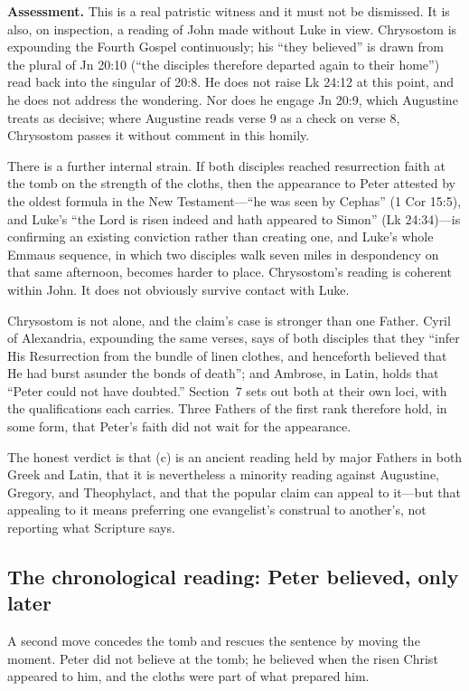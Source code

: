 \textbf{Assessment.} This is a real patristic witness and it must not be
dismissed. It is also, on inspection, a reading of John made without Luke in
view. Chrysostom is expounding the Fourth Gospel continuously; his ``they
believed'' is drawn from the plural of Jn 20:10 (``the disciples therefore
departed again to their home'') read back into the singular of 20:8. He does
not raise Lk 24:12 at this point, and he does not address the wondering. Nor
does he engage Jn 20:9, which Augustine treats as decisive; where Augustine
reads verse 9 as a check on verse 8, Chrysostom passes it without comment in
this homily.

There is a further internal strain. If both disciples reached resurrection
faith at the tomb on the strength of the cloths, then the appearance to Peter
attested by the oldest formula in the New Testament---``he was seen by
Cephas'' (1 Cor 15:5), and Luke's ``the Lord is risen indeed and hath appeared
to Simon'' (Lk 24:34)---is confirming an existing conviction rather than
creating one, and Luke's whole Emmaus sequence, in which two disciples walk
seven miles in despondency on that same afternoon, becomes harder to place.
Chrysostom's reading is coherent within John. It does not obviously survive
contact with Luke.

Chrysostom is not alone, and the claim's case is stronger than one Father.
Cyril of Alexandria, expounding the same verses, says of both disciples that
they ``infer His Resurrection from the bundle of linen clothes, and henceforth
believed that He had burst asunder the bonds of death''; and Ambrose, in Latin,
holds that ``Peter could not have doubted.'' Section~7 sets out both at their
own loci, with the qualifications each carries. Three Fathers of the first rank
therefore hold, in some form, that Peter's faith did not wait for the
appearance.

The honest verdict is that (c) is an ancient reading held by major Fathers in
both Greek and Latin, that it is nevertheless a minority reading against
Augustine, Gregory, and Theophylact, and that the popular claim can appeal to
it---but that appealing to it means preferring one evangelist's construal to
another's, not reporting what Scripture says.

\subsection{The chronological reading: Peter believed, only later}

A second move concedes the tomb and rescues the sentence by moving the moment.
Peter did not believe at the tomb; he believed when the risen Christ appeared
to him, and the cloths were part of what prepared him.

